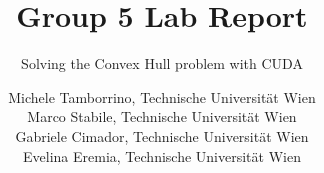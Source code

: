 \documentclass[a4paper,oneside,11pt,DIV12,headsepline,footexclude,headexclude]{scrartcl}
\newif\ifpdf
\begin{document}
\ifpdf
	\DeclareGraphicsExtensions{.pdf,.jpg,.png}
\else
\fi


\pagestyle{plain} %

\title{\Huge Group 5 Lab Report}
\subtitle{\Large Solving the Convex Hull problem with CUDA}
\author{Michele Tamborrino, Technische Universit{\"a}t Wien\\
Marco Stabile, Technische Universit{\"a}t Wien\\
Gabriele Cimador, Technische Universit{\"a}t Wien\\
Evelina Eremia, Technische Universit{\"a}t Wien}
\date{} %

\maketitle
\end{document}
